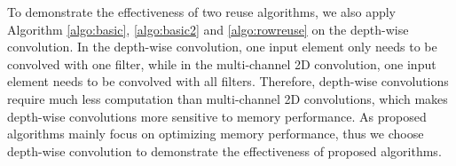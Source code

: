 
To demonstrate the effectiveness of two reuse algorithms, we also apply Algorithm \ref{algo:basic}, \ref{algo:basic2} and \ref{algo:rowreuse} on the depth-wise convolution. In the depth-wise convolution, one input element only needs to be convolved with one filter, while in the multi-channel 2D convolution, one input element needs to be convolved with all filters. Therefore, depth-wise convolutions require much less computation than multi-channel 2D convolutions, which makes depth-wise convolutions more sensitive to memory performance. As proposed algorithms mainly focus on optimizing memory performance, thus we choose depth-wise convolution to demonstrate the effectiveness of proposed algorithms.
 


